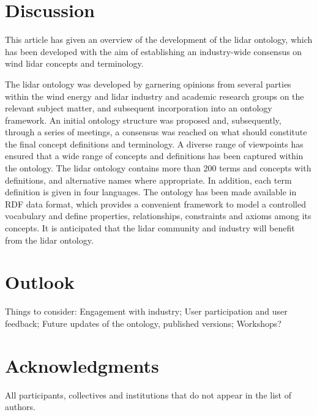 \documentclass[remotesensing,article,submit,pdftex,moreauthors]{Definitions/mdpi}
\begin{document}

\section{Discussion}
\label{sec:Discussion}
This article has given an overview of the development of the lidar ontology, which has been developed with the aim of establishing an industry-wide consensus on wind lidar concepts and terminology.

The lidar ontology was developed by garnering opinions from several parties within the wind energy and lidar industry and academic research groups on the relevant subject matter, and subsequent incorporation into an ontology framework. 
An initial ontology structure was proposed and, subsequently, through a series of meetings, a consensus was reached on what should constitute the final concept definitions and terminology.
A diverse range of viewpoints has ensured that a wide range of concepts and definitions has been captured within the ontology. 
The lidar ontology contains more than 200 terms and concepts with definitions, and alternative names where appropriate. In addition, each term definition is given in four languages. 
The ontology has been made available in RDF data format, which provides a convenient framework to model a controlled vocabulary and define properties, relationships, constraints and axioms among its concepts.
It is anticipated that the lidar community and industry will benefit from the lidar ontology.





\section{Outlook}
\label{sec:Outlook}
Things to consider: Engagement with industry; User participation and user feedback; Future updates of the ontology, published versions; Workshops?

\section{Acknowledgments}
All participants, collectives and institutions that do not appear in the list of authors.
\end{document}
